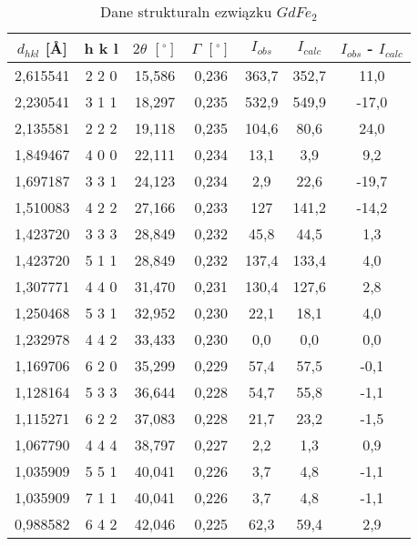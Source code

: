 \documentclass[a4paper,12pt]{article}
\numberwithin{equation}{section}
\begin{document}
\begin{appendices}
\begin{longtable}[c]{|c|c|c|c|c|c|c|}
 \end{longtable}



  \label{GdRentgenTab}
  \scriptsize
  \begin{longtable}[c]{|c|c|c|c|c|c|c|}
\caption{Dane strukturaln ezwiązku $GdFe_2$}\\
  \hline
    $d_{hkl}$ [\AA]&	h	k	l&$2\theta$ $\left[ ^{\circ}\right]$&$\Gamma$ $\left[ ^{\circ}\right]$&$I_{obs}$&$I_{calc}$	&$I_{obs}$ - $I_{calc}$	\\\hline\hline
2,615541	&	2   2   0	&	15,586	&	0,236	&	363,7	&	352,7	&	11,0	\\\hline
2,230541	&	3   1   1	&	18,297	&	0,235	&	532,9	&	549,9	&	-17,0	\\\hline
2,135581	&	2   2   2	&	19,118	&	0,235	&	104,6	&	80,6	&	24,0	\\\hline
1,849467	&	4   0   0	&	22,111	&	0,234	&	13,1	&	3,9	&	9,2	\\\hline
1,697187	&	3   3   1	&	24,123	&	0,234	&	2,9	&	22,6	&	-19,7	\\\hline
1,510083	&	4   2   2	&	27,166	&	0,233	&	127	&	141,2	&	-14,2	\\\hline
1,423720	&	3   3   3	&	28,849	&	0,232	&	45,8	&	44,5	&	1,3	\\\hline
1,423720	&	5   1   1	&	28,849	&	0,232	&	137,4	&	133,4	&	4,0	\\\hline
1,307771	&	4   4   0	&	31,470	&	0,231	&	130,4	&	127,6	&	2,8	\\\hline
1,250468	&	5   3   1	&	32,952	&	0,230	&	22,1	&	18,1	&	4,0	\\\hline
1,232978	&	4   4   2	&	33,433	&	0,230	&	0,0	&	0,0	&	0,0	\\\hline
1,169706	&	6   2   0	&	35,299	&	0,229	&	57,4	&	57,5	&	-0,1	\\\hline
1,128164	&	5   3   3	&	36,644	&	0,228	&	54,7	&	55,8	&	-1,1	\\\hline
1,115271	&	6   2   2	&	37,083	&	0,228	&	21,7	&	23,2	&	-1,5	\\\hline
1,067790	&	4   4   4	&	38,797	&	0,227	&	2,2	&	1,3	&	0,9	\\\hline
1,035909	&	5   5   1	&	40,041	&	0,226	&	3,7	&	4,8	&	-1,1	\\\hline
1,035909	&	7   1   1	&	40,041	&	0,226	&	3,7	&	4,8	&	-1,1	\\\hline
0,988582	&	6   4   2	&	42,046	&	0,225	&	62,3	&	59,4	&	2,9	\\\hline

\end{longtable}
\end{appendices}
\end{document}
